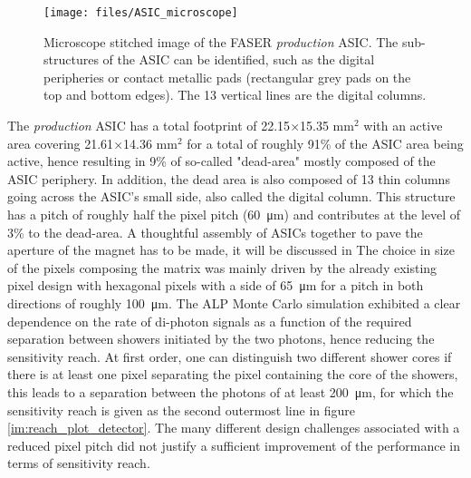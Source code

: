 		\begin{figure}[h]
			\centering
			\texttt{[image: files/ASIC\_microscope]}
			\caption{Microscope stitched image of the FASER \textit{production} ASIC. The sub-structures of the ASIC can be identified, such as the digital peripheries or contact metallic pads (rectangular grey pads on the top and bottom edges). The 13 vertical lines are the digital columns.}
			\label{im:ASIC_microscope}
		\end{figure}
		
		The \textit{production} ASIC has a total footprint of 22.15$\times$15.35 mm$^2$ with an active area covering 21.61$\times$14.36 mm$^2$ for a total of roughly 91\% of the ASIC area being active, hence resulting in 9\% of so-called "dead-area" mostly composed of the ASIC periphery. In addition, the dead area is also composed of 13 thin columns going across the ASIC's small side, also called the digital column. This structure has a pitch of roughly half the pixel pitch (\SI{60}{\micro\meter}) and contributes at the level of 3\% to the dead-area. A thoughtful assembly of ASICs together to pave the aperture of the magnet has to be made, it will be discussed in  
		The choice in size of the pixels composing the matrix was mainly driven by the already existing pixel design with hexagonal pixels with a side of \SI{65}{\micro\meter} for a pitch in both directions of roughly \SI{100}{\micro\meter}. The ALP Monte Carlo simulation exhibited a clear dependence on the rate of di-photon signals as a function of the required separation between showers initiated by the two photons, hence reducing the sensitivity reach. At first order, one can distinguish two different shower cores if there is at least one pixel separating the pixel containing the core of the showers, this leads to a separation between the photons of at least \SI{200}{\micro\meter}, for which the sensitivity reach is given as the second outermost line in figure \ref{im:reach_plot_detector}. The many different design challenges associated with a reduced pixel pitch did not justify a sufficient improvement of the performance in terms of sensitivity reach. 
		
